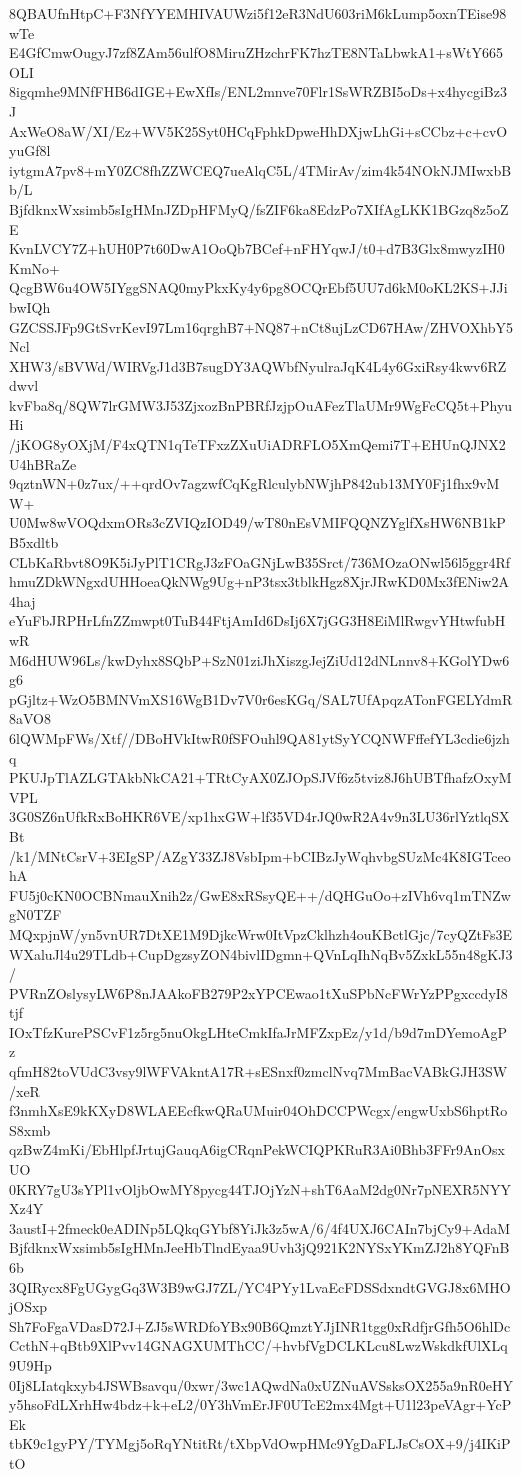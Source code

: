 8QBAUfnHtpC+F3NfYYEMHIVAUWzi5f12eR3NdU603riM6kLump5oxnTEise98wTe
E4GfCmwOugyJ7zf8ZAm56ulfO8MiruZHzchrFK7hzTE8NTaLbwkA1+sWtY665OLI
8igqmhe9MNfFHB6dIGE+EwXfIs/ENL2mnve70Flr1SsWRZBI5oDs+x4hycgiBz3J
AxWeO8aW/XI/Ez+WV5K25Syt0HCqFphkDpweHhDXjwLhGi+sCCbz+c+cvOyuGf8l
iytgmA7pv8+mY0ZC8fhZZWCEQ7ueAlqC5L/4TMirAv/zim4k54NOkNJMIwxbBb/L
BjfdknxWxsimb5sIgHMnJZDpHFMyQ/fsZIF6ka8EdzPo7XIfAgLKK1BGzq8z5oZE
KvnLVCY7Z+hUH0P7t60DwA1OoQb7BCef+nFHYqwJ/t0+d7B3Glx8mwyzIH0KmNo+
QcgBW6u4OW5IYggSNAQ0myPkxKy4y6pg8OCQrEbf5UU7d6kM0oKL2KS+JJibwIQh
GZCSSJFp9GtSvrKevI97Lm16qrghB7+NQ87+nCt8ujLzCD67HAw/ZHVOXhbY5Ncl
XHW3/sBVWd/WIRVgJ1d3B7sugDY3AQWbfNyulraJqK4L4y6GxiRsy4kwv6RZdwvl
kvFba8q/8QW7lrGMW3J53ZjxozBnPBRfJzjpOuAFezTlaUMr9WgFcCQ5t+PhyuHi
/jKOG8yOXjM/F4xQTN1qTeTFxzZXuUiADRFLO5XmQemi7T+EHUnQJNX2U4hBRaZe
9qztnWN+0z7ux/++qrdOv7agzwfCqKgRlculybNWjhP842ub13MY0Fj1fhx9vMW+
U0Mw8wVOQdxmORs3cZVIQzIOD49/wT80nEsVMIFQQNZYglfXsHW6NB1kPB5xdltb
CLbKaRbvt8O9K5iJyPlT1CRgJ3zFOaGNjLwB35Srct/736MOzaONwl56l5ggr4Rf
hmuZDkWNgxdUHHoeaQkNWg9Ug+nP3tsx3tblkHgz8XjrJRwKD0Mx3fENiw2A4haj
eYuFbJRPHrLfnZZmwpt0TuB44FtjAmId6DsIj6X7jGG3H8EiMlRwgvYHtwfubHwR
M6dHUW96Ls/kwDyhx8SQbP+SzN01ziJhXiszgJejZiUd12dNLnnv8+KGolYDw6g6
pGjltz+WzO5BMNVmXS16WgB1Dv7V0r6esKGq/SAL7UfApqzATonFGELYdmR8aVO8
6lQWMpFWs/Xtf//DBoHVkItwR0fSFOuhl9QA81ytSyYCQNWFffefYL3cdie6jzhq
PKUJpTlAZLGTAkbNkCA21+TRtCyAX0ZJOpSJVf6z5tviz8J6hUBTfhafzOxyMVPL
3G0SZ6nUfkRxBoHKR6VE/xp1hxGW+lf35VD4rJQ0wR2A4v9n3LU36rlYztlqSXBt
/k1/MNtCsrV+3EIgSP/AZgY33ZJ8VsbIpm+bCIBzJyWqhvbgSUzMc4K8IGTceohA
FU5j0cKN0OCBNmauXnih2z/GwE8xRSsyQE++/dQHGuOo+zIVh6vq1mTNZwgN0TZF
MQxpjnW/yn5vnUR7DtXE1M9DjkcWrw0ItVpzCklhzh4ouKBctlGjc/7cyQZtFs3E
WXaluJl4u29TLdb+CupDgzsyZON4bivlIDgmn+QVnLqIhNqBv5ZxkL55n48gKJ3/
PVRnZOslysyLW6P8nJAAkoFB279P2xYPCEwao1tXuSPbNcFWrYzPPgxccdyI8tjf
IOxTfzKurePSCvF1z5rg5nuOkgLHteCmkIfaJrMFZxpEz/y1d/b9d7mDYemoAgPz
qfmH82toVUdC3vsy9lWFVAkntA17R+sESnxf0zmclNvq7MmBacVABkGJH3SW/xeR
f3nmhXsE9kKXyD8WLAEEcfkwQRaUMuir04OhDCCPWcgx/engwUxbS6hptRoS8xmb
qzBwZ4mKi/EbHlpfJrtujGauqA6igCRqnPekWCIQPKRuR3Ai0Bhb3FFr9AnOsxUO
0KRY7gU3sYPl1vOljbOwMY8pycg44TJOjYzN+shT6AaM2dg0Nr7pNEXR5NYYXz4Y
3austI+2fmeck0eADINp5LQkqGYbf8YiJk3z5wA/6/4f4UXJ6CAIn7bjCy9+AdaM
BjfdknxWxsimb5sIgHMnJeeHbTlndEyaa9Uvh3jQ921K2NYSxYKmZJ2h8YQFnB6b
3QIRycx8FgUGygGq3W3B9wGJ7ZL/YC4PYy1LvaEcFDSSdxndtGVGJ8x6MHOjOSxp
Sh7FoFgaVDasD72J+ZJ5sWRDfoYBx90B6QmztYJjINR1tgg0xRdfjrGfh5O6hlDc
CcthN+qBtb9XlPvv14GNAGXUMThCC/+hvbfVgDCLKLcu8LwzWskdkfUlXLq9U9Hp
0Ij8LIatqkxyb4JSWBsavqu/0xwr/3wc1AQwdNa0xUZNuAVSsksOX255a9nR0eHY
y5hsoFdLXrhHw4bdz+k+eL2/0Y3hVmErJF0UTcE2mx4Mgt+U1l23peVAgr+YcPEk
tbK9c1gyPY/TYMgj5oRqYNtitRt/tXbpVdOwpHMc9YgDaFLJsCsOX+9/j4IKiPtO
